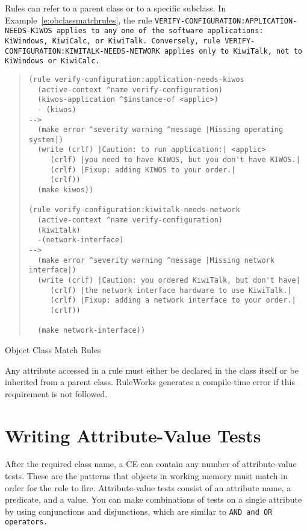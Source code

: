 Rules can refer to a parent class or to a specific subclass. In
Example~\ref{e:obclassmatchrules}, the rule
\tt{VERIFY-CONFIGURATION:APPLICATION-NEEDS-KIWOS} applies to any one
of the software applications: \tt{KiWindows}, \tt{KiwiCalc}, or
\tt{KiwiTalk}. Conversely, rule
\tt{VERIFY-CONFIGURATION:KIWITALK-NEEDS-NETWORK} applies only to
\tt{KiwiTalk}, not to \tt{KiWindows} or \tt{KiwiCalc}.

\begin{example}[h]
\begin{quote}
\begin{verbatim}
(rule verify-configuration:application-needs-kiwos
  (active-context ^name verify-configuration)
  (kiwos-application ^$instance-of <applic>)
  - (kiwos)
-->
  (make error ^severity warning ^message |Missing operating system|)
  (write (crlf) |Caution: to run application:| <applic>
     (crlf) |you need to have KIWOS, but you don't have KIWOS.|
     (crlf) |Fixup: adding KIWOS to your order.|
     (crlf))
  (make kiwos))

(rule verify-configuration:kiwitalk-needs-network
  (active-context ^name verify-configuration)
  (kiwitalk)
  -(network-interface)
-->
  (make error ^severity warning ^message |Missing network interface|)
  (write (crlf) |Caution: you ordered KiwiTalk, but don't have|
     (crlf) |the network interface hardware to use KiwiTalk.|
     (crlf) |Fixup: adding a network interface to your order.|
     (crlf))

  (make network-interface))
\end{verbatim}
\end{quote}
\caption{Object Class Match Rules}
\label{e:obclassmatchrules}
\end{example}

\begin{note}
  Any attribute accessed in a rule must either be declared in the
  class itself or be inherited from a parent class. RuleWorks
  generates a compile-time error if this requirement is not followed.
\end{note}

\section{Writing Attribute-Value Tests}

After the required class name, a CE can contain any number of
attribute-value tests. These are the patterns that objects in working
memory must match in order for the rule to fire. Attribute-value tests
consist of an attribute name, a predicate, and a value. You can make
combinations of tests on a single attribute by using conjunctions and
disjunctions, which are similar to \tt{AND} and \tt{OR} operators.

